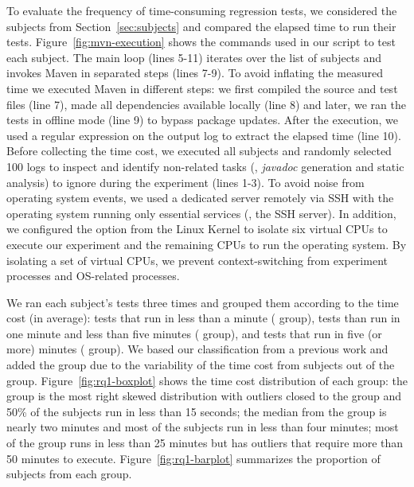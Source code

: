To evaluate the frequency of time-consuming regression tests, we
considered the \numSubjs{} subjects from Section~\ref{sec:subjects}
and compared the elapsed time to run their tests. 
Figure~\ref{fig:mvn-execution} shows the commands used in our script
to test each subject. The main loop (lines 5-11) iterates over the
list of subjects and invokes Maven in separated steps (lines 7-9). To
avoid inflating the measured time we executed Maven in different
steps: we first compiled the source and test files (line 7), made all
dependencies available locally (line 8) and later, we ran the tests in
offline mode (line 9) to bypass package updates. After the execution,
we used a regular expression on the output log to extract the elapsed
time (line 10). Before collecting the time cost, we executed all
subjects and randomly selected 100 logs to inspect and identify
non-related tasks (\eg, \emph{javadoc} generation and static analysis)
to ignore during the experiment (lines 1-3).  To avoid noise from
operating system events, we used a dedicated server remotely via SSH
with the operating system running only essential services (\eg, the
SSH server). In addition, we configured the  option
from the Linux Kernel \cite{linux-kernel} to isolate six virtual CPUs
to execute our experiment and the remaining CPUs to run the operating
system. By isolating a set of virtual CPUs, we prevent
context-switching from experiment processes and OS-related processes.



We ran each subject's tests three times and grouped them according to
the time cost (in average): tests that run in less than a minute
(\shortg{} group), tests than run in one minute and less than five
minutes (\medg{} group), and tests that run in five (or more) minutes
(\longg{} group). We based our classification from a previous work
\cite{gligoric-etal-issta2015} and added the \medg{} group due to the
variability of the time cost from subjects out of the \shortg{} group.
Figure~\ref{fig:rq1-boxplot} shows the time cost distribution of each
group: the \shortg{} group is the most right skewed distribution with
outliers closed to the \medg{} group and 50\% of the subjects run in
less than 15 seconds; the median from the \medg{} group is nearly two
minutes and most of the subjects run in less than four minutes; most
of the \longg{} group runs in less than 25 minutes but has outliers
that require more than 50 minutes to execute.
Figure~\ref{fig:rq1-barplot} summarizes the proportion of subjects
from each group.


